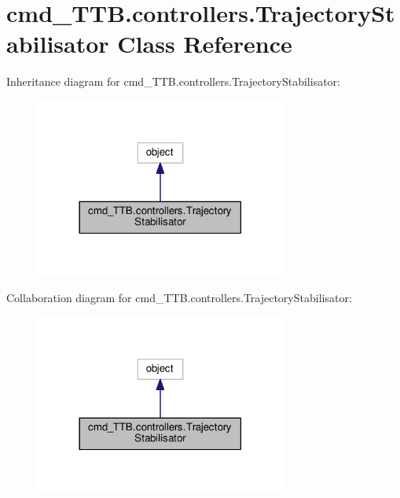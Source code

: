 \hypertarget{classcmd__TTB_1_1controllers_1_1TrajectoryStabilisator}{}\section{cmd\+\_\+\+T\+T\+B.\+controllers.\+Trajectory\+Stabilisator Class Reference}
\label{classcmd__TTB_1_1controllers_1_1TrajectoryStabilisator}


Inheritance diagram for cmd\+\_\+\+T\+T\+B.\+controllers.\+Trajectory\+Stabilisator\+:\nopagebreak
\begin{figure}[H]
\begin{center}
\leavevmode
\includegraphics[width=234pt]{classcmd__TTB_1_1controllers_1_1TrajectoryStabilisator__inherit__graph}
\end{center}
\end{figure}


Collaboration diagram for cmd\+\_\+\+T\+T\+B.\+controllers.\+Trajectory\+Stabilisator\+:\nopagebreak
\begin{figure}[H]
\begin{center}
\leavevmode
\includegraphics[width=234pt]{classcmd__TTB_1_1controllers_1_1TrajectoryStabilisator__coll__graph}
\end{center}
\end{figure}
